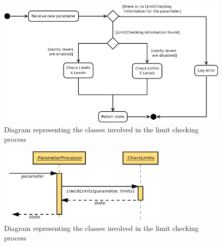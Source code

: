 \begin{figure}[H]
\centerline{\includegraphics[width=1\textwidth]{images/LimitCheckingFlowChart.png}}
\caption{Diagram representing the classes involved in the limit checking process}
\label{f5.11}
\end{figure}


\begin{figure}[H]
\centerline{\includegraphics[width=0.75\textwidth]{images/CheckLimitsSequence.png}}
\caption{Diagram representing the classes involved in the limit checking process}
\label{f5.12}
\end{figure}
\newpage

